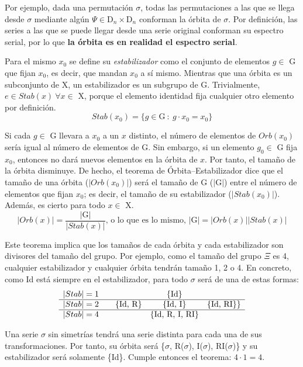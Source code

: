 		Por ejemplo, dada una permutación $\sigma$, todas las permutaciones a las que se llega desde $\sigma$ mediante algún $\Psi\in\mbox{D}_{n}\times\mbox{D}_{n}$ %
		conforman la órbita de $\sigma$. Por definición, las series a las que se puede llegar desde una serie original conforman su espectro serial, por lo que \textbf{la órbita es en realidad el espectro serial}.
	
		Para el mismo $x_0$ se define su \emph{estabilizador} como el conjunto de elementos $g\in$ G que fijan $x_0$, es decir, que mandan $x_0$ a sí mismo. Mientras que una órbita es un subconjunto de X, un estabilizador es un subgrupo de G. Trivialmente, $e\in Stab(x) \ \forall x\in$ X, porque el elemento identidad fija cualquier otro elemento por definición.
		\[Stab(x_0)=\{g\in \mbox{G}\ :\ g\cdot x_0 =x_0 \}\]
	
		Si cada $g\in$ G llevara a $x_0$ a un $x$ distinto, el número de elementos de $Orb(x_0)$ sería igual al número de elementos de G. Sin embargo, si un elemento $g_0\in$ G fija $x_0$, entonces no dará nuevos elementos en la órbita de $x$. Por tanto, el tamaño de la órbita disminuye. De hecho,  el teorema de Órbita--Estabilizador dice que el tamaño de una órbita ($|Orb(x_0)|$) será el tamaño de G ($|$G$|$) entre el número de elementos que fijan $x_0$; es decir, el tamaño de su estabilizador ($|Stab(x_0)|$). Además, es cierto para todo $x\in$ X.
		\[|Orb(x)|=\frac{|\mbox{G}|}{|Stab(x)|}\mbox{, o lo que es lo mismo, }|\mbox{G}|=|Orb(x)||Stab(x)|\]
		
		\def\arraystretch{1.5}
		Este teorema implica que los tamaños de cada órbita y cada estabilizador son divisores del tamaño del grupo. Por ejemplo, como el tamaño del grupo $\Xi$ es 4, cualquier estabilizador y cualquier órbita tendrán tamaño 1, 2 o 4. En concreto, como Id está siempre en el estabilizador, para  todo $\sigma$ será de una de estas formas:
		\[\begin{array}{*{5}c}
		|Stab|=1&&&\{\mbox{Id}\}&\\
		\hline|Stab|=2&&\{\mbox{Id, R}\}&\{\mbox{Id, I}\}&\{\mbox{Id, RI}\}\}\\
		\hline|Stab|=4&&&\{\mbox{Id, R, I, RI}\}&\\
		\end{array}\]
		
		\def\arraystretch{1}
		Una serie $\sigma$ sin simetrías tendrá una serie distinta para cada una de sus transformaciones. Por tanto, su órbita será \{$\sigma$, R($\sigma$), I($\sigma$), RI($\sigma$)\} y su estabilizador será solamente \{Id\}. Cumple entonces el teorema: $4\cdot 1 = 4$.
	
